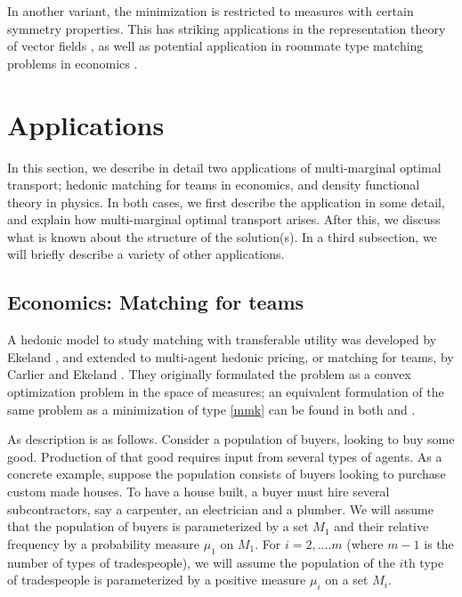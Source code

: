 \documentclass[letter,10pt]{article}
\theoremstyle{dotless}
\begin{document}
In another variant, the minimization is restricted to measures with certain symmetry properties.  This has striking applications in the representation theory of vector fields \cite{GG}\cite{GhM}\cite{GhMa}, as well as potential application in roommate type matching problems in economics \cite{cgs}.
\section{Applications}
In this section, we describe in detail two applications of multi-marginal optimal transport; hedonic matching for teams in economics, and density functional theory in physics.   In both cases, we first describe the application in some detail, and explain how multi-marginal optimal transport arises.  After this, we discuss what is known about the structure of the solution(s).  In a third subsection, we will briefly describe a variety of other applications.
\subsection{Economics: Matching for teams}
A hedonic model to study matching with transferable utility was developed by Ekeland \cite{E}, and extended to multi-agent hedonic pricing, or matching for teams, by Carlier and Ekeland \cite{CE}.  They originally formulated the problem as a convex optimization problem in the space of measures; an equivalent formulation of the same problem as a minimization of type \eqref{mmk} can be found in both \cite{CE} and \cite{cmn}. 

As description is as follows.  Consider a population of buyers, looking to buy some good.   Production of that good requires input from several types of agents.  As a concrete example, suppose the population consists of buyers looking to purchase custom made houses.   To have a house built, a buyer must hire several subcontractors, say a carpenter, an electrician and  a plumber.  We will assume that the population of buyers is parameterized by a set $M_1$ and their relative frequency by a probability measure $\mu_1$ on $M_1$.   For $i=2,....m$ (where $m-1$ is the number of types of tradespeople), we will assume the population of the $i$th type of tradespeople is parameterized by a positive measure $\mu_i$ on a set $M_i$.  
\end{document}
